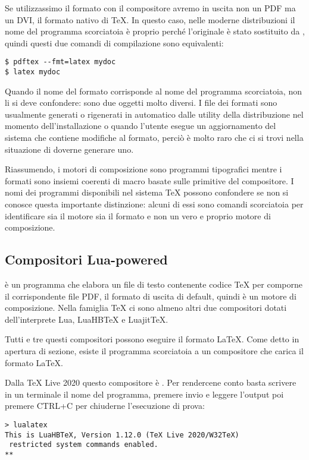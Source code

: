 Se utilizzassimo il formato  con il compositore  avremo
in uscita non un PDF ma un DVI, il formato nativo di \TeX{}. In questo caso,
nelle moderne distribuzioni il nome del programma scorciatoia è proprio
 perché l'originale  è stato sostituito da ,
quindi questi due comandi di compilazione sono equivalenti:
\begin{Verbatim}[numbers=none]
$ pdftex --fmt=latex mydoc
$ latex mydoc
\end{Verbatim}

Quando il nome del formato corrisponde al nome del programma scorciatoia, non li
si deve confondere: sono due oggetti molto diversi. I file dei formati sono
usualmente generati o rigenerati in automatico dalle utility della distribuzione
nel momento dell'installazione o quando l'utente esegue un aggiornamento del
sistema che contiene modifiche al formato, perciò è molto raro che ci si trovi
nella situazione di doverne generare uno.

Riassumendo, i motori di composizione sono programmi tipografici mentre i
formati sono insiemi coerenti di macro basate sulle primitive del compositore. I
nomi dei programmi disponibili nel sistema \TeX{} possono confondere se non si
conosce questa importante distinzione: alcuni di essi sono comandi scorciatoia
per identificare sia il motore sia il formato e non un vero e proprio motore di
composizione.


\subsection{Compositori Lua-powered}

\LuaTeX{} è un programma che elabora un file di testo contenente codice \TeX{}
per comporne il corrispondente file PDF, il formato di uscita di default, quindi
è un motore di composizione. Nella famiglia \TeX{} ci sono almeno altri due
compositori dotati dell'interprete Lua, LuaHB\TeX{} e Luajit\TeX{}.

Tutti e tre questi compositori possono eseguire il formato \LaTeX. Come detto in
apertura di sezione, esiste il programma  scorciatoia a un
compositore che carica il formato \LaTeX.

Dalla TeX Live 2020 questo compositore è . Per rendercene conto
basta scrivere in un terminale il nome del programma, premere invio e leggere
l'output poi premere CTRL+C per chiuderne l'esecuzione di prova:
\begin{Verbatim}[numbers=none]
> lualatex
This is LuaHBTeX, Version 1.12.0 (TeX Live 2020/W32TeX)
 restricted system commands enabled.
**
\end{Verbatim}

